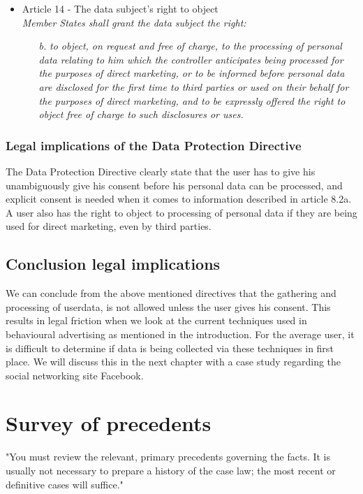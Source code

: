 \documentclass[11pt]{article}
\newcommand{\DPD}{Data Protection Directive }
\begin{document}
\begin{itemize}
\begin{itemize}
		\end{itemize}

	\item Article 14 - The data subject's right to object\\
		\emph{Member States shall grant the data subject the right:}
		\begin{itemize}
			\item  [\textit{b.}] {\it to object, on request and free of charge, to the processing of personal data relating to him which the controller anticipates being processed for the purposes of direct marketing, or to be informed before personal data are disclosed for the first time to third parties or used on their behalf for the purposes of direct marketing, and to be expressly offered the right to object free of charge to such disclosures or uses.}
		\end{itemize}
		

\end{itemize}

\subsubsection{Legal implications of the \DPD}
The \DPD clearly state that the user has to give his unambiguously give his consent before his personal data can be processed, and explicit consent is needed when it comes to information described in article 8.2a. A user also has the right to object to processing of personal data if they are being used for direct marketing, even by third parties.

\subsection{Conclusion legal implications}

We can conclude from the above mentioned directives that the gathering and processing of userdata, is not allowed unless the user gives his consent. This results in legal friction when we look at the current techniques used in behavioural advertising as mentioned in the introduction. For the average user, it is difficult to determine if data is being collected via these techniques in first place. We will discuss this in the next chapter with a case study regarding the social networking site Facebook.



\section{Survey of precedents}
"You must review the relevant, primary precedents governing the facts. It is usually not
necessary to prepare a history of the case law; the most recent or definitive cases will
suffice."
\end{document}
